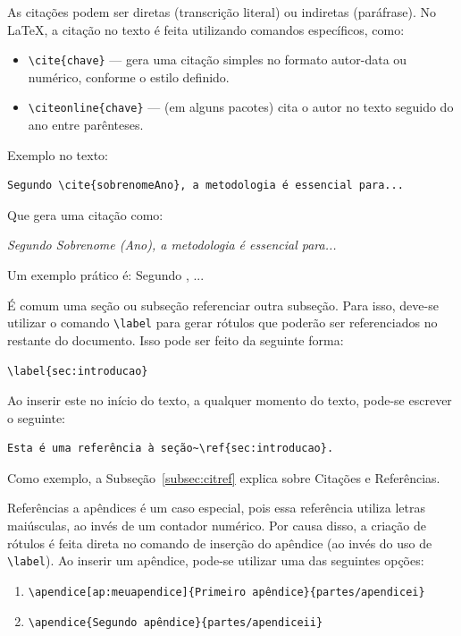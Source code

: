 As citações podem ser diretas (transcrição literal) ou indiretas (paráfrase). No \LaTeX, a citação no texto é feita utilizando comandos específicos, como:

\begin{itemize}
    \item \texttt{\textbackslash cite\{chave\}} — gera uma citação simples no formato autor-data ou numérico, conforme o estilo definido.
    \item \texttt{\textbackslash citeonline\{chave\}} — (em alguns pacotes) cita o autor no texto seguido do ano entre parênteses.
\end{itemize}

Exemplo no texto:

\begin{verbatim}
Segundo \cite{sobrenomeAno}, a metodologia é essencial para...
\end{verbatim}

Que gera uma citação como:

\textit{Segundo Sobrenome (Ano), a metodologia é essencial para...}

Um exemplo prático é: Segundo \cite{Knuth_1986_texbook}, ...

\label{subsubsec:referencias}

É comum uma seção ou subseção referenciar outra subseção. Para isso, deve-se utilizar o comando \verb+\label+ para gerar rótulos que poderão ser referenciados no restante do documento. Isso pode ser feito da seguinte forma:

\begin{verbatim}
\label{sec:introducao}
\end{verbatim}

Ao inserir este no início do texto, a qualquer momento do texto, pode-se escrever o seguinte:
\begin{verbatim}
Esta é uma referência à seção~\ref{sec:introducao}.
\end{verbatim}

Como exemplo, a Subseção~\ref{subsec:citref} explica sobre Citações e Referências.

Referências a apêndices é um caso especial, pois essa referência utiliza letras maiúsculas, ao invés de um contador numérico. Por causa disso, a criação de rótulos é feita direta no comando de inserção do apêndice (ao invés do uso de \verb+\label+). Ao inserir um apêndice, pode-se utilizar uma das seguintes opções:

\begin{enumerate}
    \item \verb+\apendice[ap:meuapendice]{Primeiro apêndice}{partes/apendicei}+
    \item \verb+\apendice{Segundo apêndice}{partes/apendiceii}+
\end{enumerate}

